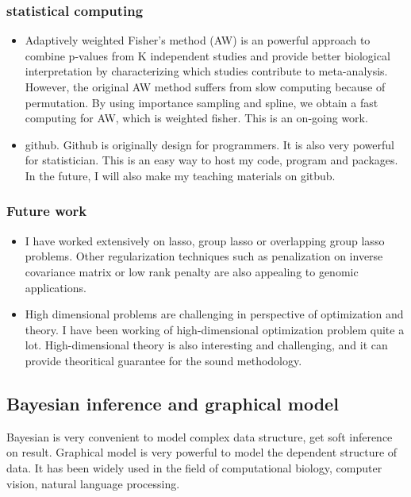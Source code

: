 \documentclass[a4paper, 10pt]{article}
\begin{document}
\subsubsection{statistical computing}

\begin{itemize}
\item 
Adaptively weighted Fisher's method (AW) is an powerful approach to combine p-values from K independent studies 
and provide better biological interpretation by characterizing which studies contribute to meta-analysis.
However, the original AW method suffers from slow computing because of permutation.
By using importance sampling and spline, 
we obtain a fast computing for AW, which is weighted fisher.
This is an on-going work.

\item github. Github is originally design for programmers. 
It is also very powerful for statistician.
This is an easy way to host my code, program and packages.
In the future, I will also make my teaching materials on gitbub.

\end{itemize}

\subsubsection{Future work}
\begin{itemize}
\item I have worked extensively on lasso, group lasso or overlapping group lasso problems.
Other regularization techniques such as penalization on inverse covariance matrix or low rank penalty are also appealing to genomic applications.
\item High dimensional problems are challenging in perspective of optimization and theory.
I have been working of high-dimensional optimization problem quite a lot.
High-dimensional theory is also interesting and challenging, and it can provide theoritical guarantee for the sound methodology.


\end{itemize}


\subsection{Bayesian inference and graphical model}
Bayesian is very convenient to model complex data structure, 
get soft inference on result.
Graphical model is very powerful to model the dependent structure of data.
It has been widely used in the field of computational biology, computer vision, natural language processing.
\end{document}
